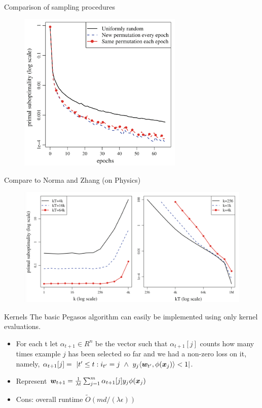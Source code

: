 \begin{frame}{Comparison of sampling procedures}
    \begin{figure}[htbp]
        \centering
        \includegraphics[height=0.7\textheight, width=0.7\textwidth]{images/epochs.png}
    \end{figure}
\end{frame}

\begin{frame}{Compare to Norma and Zhang (on Physics)}
    \begin{figure}[htbp]
        \centering
        \includegraphics[height=0.7\textheight, width=\textwidth]{images/comp_nzh.png}
    \end{figure}
\end{frame}

\begin{frame}{Kernels}
    The basic Pegasos algorithm can easily be implemented using only kernel evaluations.
    \begin{itemize}
        \item For each t let $\mathbb{\alpha}_{t+1}\in R^n$ be the vector such that $\alpha_{t+1}[j]$ counts how many times example $j$ has been selected so far and we had a non-zero loss on it, namely, $\alpha_{t+1}[j]=\ |{t'\le t:i_{t'}=j\ \wedge\ y_j\langle \wv_{t'},\phi(\xv_j)\rangle < 1}|$.
        \item Represent $\bm{w}_{t+1} = \frac{1}{\lambda t} \sum_{j=1}^{m} \alpha_{t+1}[j]y_j\phi(\bm{x}_j)$
        \item {\color{green}Cons: overall runtime $\tilde{O}(md/(\lambda \epsilon))$}
    \end{itemize}
\end{frame}

